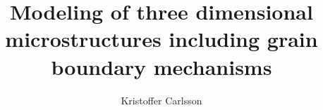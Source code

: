 \documentclass[masters,a4paper]{chalmers-thesis}
\title{Modeling of three dimensional microstructures including grain boundary mechanisms}
\author{Kristoffer Carlsson}
\begin{document}
\maketitle

\large







\newpage
\small
\printbibliography %
\large
\newpage
\appendix
\addappheadtotoc

	
\end{document}
